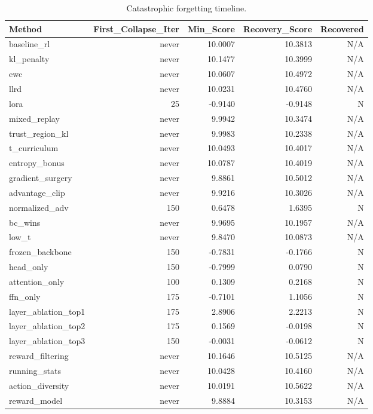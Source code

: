 \begin{table}[htbp]
\centering
\caption{Catastrophic forgetting timeline.}
\label{tab:forgetting}
\begin{tabular}{lrrrr}
\toprule
\textbf{Method} & \textbf{First\_Collapse\_Iter} & \textbf{Min\_Score} & \textbf{Recovery\_Score} & \textbf{Recovered} \\
\midrule
baseline\_rl & never & 10.0007 & 10.3813 & N/A \\
kl\_penalty & never & 10.1477 & 10.3999 & N/A \\
ewc & never & 10.0607 & 10.4972 & N/A \\
llrd & never & 10.0231 & 10.4760 & N/A \\
lora & 25 & -0.9140 & -0.9148 & N \\
mixed\_replay & never & 9.9942 & 10.3474 & N/A \\
trust\_region\_kl & never & 9.9983 & 10.2338 & N/A \\
t\_curriculum & never & 10.0493 & 10.4017 & N/A \\
entropy\_bonus & never & 10.0787 & 10.4019 & N/A \\
gradient\_surgery & never & 9.8861 & 10.5012 & N/A \\
advantage\_clip & never & 9.9216 & 10.3026 & N/A \\
normalized\_adv & 150 & 0.6478 & 1.6395 & N \\
bc\_wins & never & 9.9695 & 10.1957 & N/A \\
low\_t & never & 9.8470 & 10.0873 & N/A \\
frozen\_backbone & 150 & -0.7831 & -0.1766 & N \\
head\_only & 150 & -0.7999 & 0.0790 & N \\
attention\_only & 100 & 0.1309 & 0.2168 & N \\
ffn\_only & 175 & -0.7101 & 1.1056 & N \\
layer\_ablation\_top1 & 175 & 2.8906 & 2.2213 & N \\
layer\_ablation\_top2 & 175 & 0.1569 & -0.0198 & N \\
layer\_ablation\_top3 & 150 & -0.0031 & -0.0612 & N \\
reward\_filtering & never & 10.1646 & 10.5125 & N/A \\
running\_stats & never & 10.0428 & 10.4160 & N/A \\
action\_diversity & never & 10.0191 & 10.5622 & N/A \\
reward\_model & never & 9.8884 & 10.3153 & N/A \\
\bottomrule
\end{tabular}
\end{table}